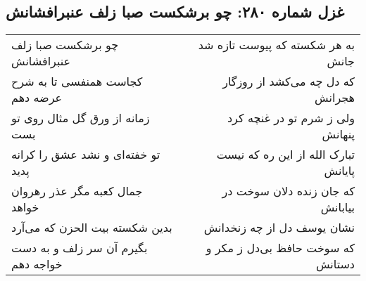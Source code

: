 \begin{center}
\section*{غزل شماره ۲۸۰: چو برشکست صبا زلف عنبرافشانش}
\label{sec:sh280}
\begin{longtable}{l p{0.5cm} r}
چو برشکست صبا زلف عنبرافشانش
&&
به هر شکسته که پیوست تازه شد جانش
\\
کجاست همنفسی تا به شرح عرضه دهم
&&
که دل چه می‌کشد از روزگار هجرانش
\\
زمانه از ورق گل مثال روی تو بست
&&
ولی ز شرم تو در غنچه کرد پنهانش
\\
تو خفته‌ای و نشد عشق را کرانه پدید
&&
تبارک الله از این ره که نیست پایانش
\\
جمال کعبه مگر عذر رهروان خواهد
&&
که جان زنده دلان سوخت در بیابانش
\\
بدین شکسته بیت الحزن که می‌آرد
&&
نشان یوسف دل از چه زنخدانش
\\
بگیرم آن سر زلف و به دست خواجه دهم
&&
که سوخت حافظ بی‌دل ز مکر و دستانش
\\
\end{longtable}
\end{center}
